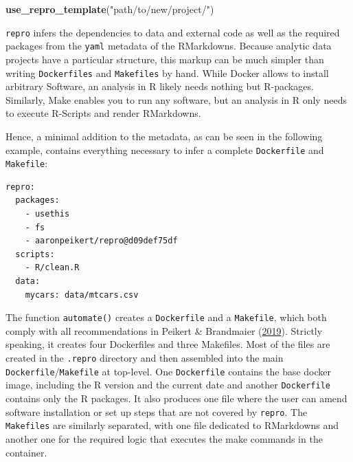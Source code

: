 \documentclass[12pt,a4paper,]{article}
\newenvironment{Shaded}{\begin{snugshade}}{\end{snugshade}}
\newcommand{\KeywordTok}[1]{\textcolor[rgb]{0.13,0.29,0.53}{\textbf{#1}}}
\newcommand{\NormalTok}[1]{#1}
\newcommand{\StringTok}[1]{\textcolor[rgb]{0.31,0.60,0.02}{#1}}
\begin{document}
\begin{Shaded}
\begin{Highlighting}[]
\KeywordTok{use_repro_template}\NormalTok{(}\StringTok{"path/to/new/project/"}\NormalTok{)}
\end{Highlighting}
\end{Shaded}

\texttt{repro} infers the dependencies to data and external code as well as the required packages from the \texttt{yaml} metadata of the RMarkdowns.
Because analytic data projects have a particular structure, this markup can be much simpler than writing \texttt{Dockerfiles} and \texttt{Makefiles} by hand.
While Docker allows to install arbitrary Software, an analysis in R likely needs nothing but R-packages. Similarly, Make enables you to run any software, but an analysis in R only needs to execute R-Scripts and render RMarkdowns.

Hence, a minimal addition to the metadata, as can be seen in the following example, contains everything necessary to infer a complete \texttt{Dockerfile} and \texttt{Makefile}:

\begin{verbatim}
repro:
  packages:
    - usethis
    - fs
    - aaronpeikert/repro@d09def75df
  scripts:
    - R/clean.R
  data:
    mycars: data/mtcars.csv
\end{verbatim}

The function \texttt{automate()} creates a \texttt{Dockerfile} and a \texttt{Makefile}, which both comply with all recommendations in Peikert \& Brandmaier (\protect\hyperlink{ref-peikertReproducibleDataAnalysis2019}{2019}).
Strictly speaking, it creates four Dockerfiles and three Makefiles.
Most of the files are created in the \texttt{.repro} directory and then assembled into the main \texttt{Dockerfile}/\texttt{Makefile} at top-level.
One \texttt{Dockerfile} contains the base docker image, including the R version and the current date and another \texttt{Dockerfile} contains only the R packages.
It also produces one file where the user can amend software installation or set up steps that are not covered by \texttt{repro}.
The \texttt{Makefiles} are similarly separated, with one file dedicated to RMarkdowns and another one for the required logic that executes the make commands in the container.
\end{document}
